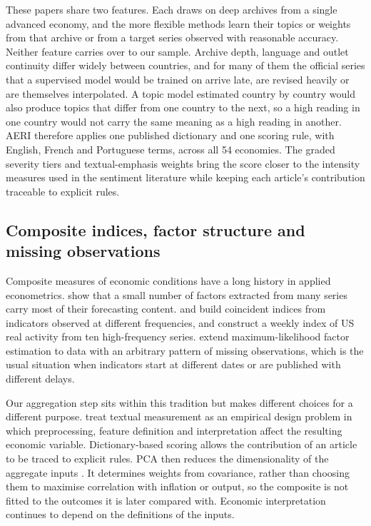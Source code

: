 \documentclass[12pt]{article}
\begin{document}
These papers share two features. Each draws on deep archives from a single advanced economy, and the more flexible methods learn their topics or weights from that archive or from a target series observed with reasonable accuracy. Neither feature carries over to our sample. Archive depth, language and outlet continuity differ widely between countries, and for many of them the official series that a supervised model would be trained on arrive late, are revised heavily or are themselves interpolated. A topic model estimated country by country would also produce topics that differ from one country to the next, so a high reading in one country would not carry the same meaning as a high reading in another. AERI therefore applies one published dictionary and one scoring rule, with English, French and Portuguese terms, across all 54 economies. The graded severity tiers and textual-emphasis weights bring the score closer to the intensity measures used in the sentiment literature while keeping each article's contribution traceable to explicit rules.
\subsection{Composite indices, factor structure and missing observations}\label{sec:literature_composite}
Composite measures of economic conditions have a long history in applied econometrics. \citet{stockwatson2002} show that a small number of factors extracted from many series carry most of their forecasting content. \citet{mariano2003} and \citet{aruoba2009} build coincident indices from indicators observed at different frequencies, and \citet{lewis2022} construct a weekly index of US real activity from ten high-frequency series. \citet{banbura2014} extend maximum-likelihood factor estimation to data with an arbitrary pattern of missing observations, which is the usual situation when indicators start at different dates or are published with different delays.

Our aggregation step sits within this tradition but makes different choices for a different purpose. \citet{gentzkow2019} treat textual measurement as an empirical design problem in which preprocessing, feature definition and interpretation affect the resulting economic variable. Dictionary-based scoring allows the contribution of an article to be traced to explicit rules. PCA then reduces the dimensionality of the aggregate inputs \citep{jolliffe2016}. It determines weights from covariance, rather than choosing them to maximise correlation with inflation or output, so the composite is not fitted to the outcomes it is later compared with. Economic interpretation continues to depend on the definitions of the inputs.
\end{document}

